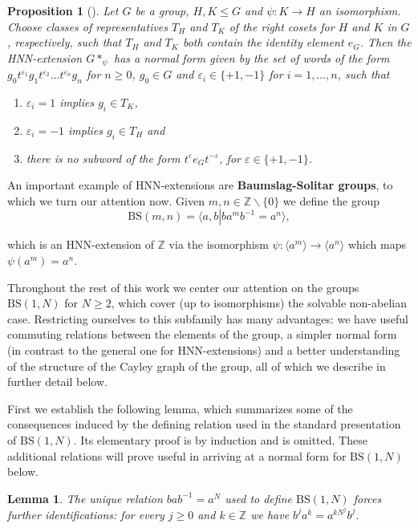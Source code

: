\documentclass[letterpaper,10pt]{amsart}
\theoremstyle{plain}
\newtheorem{lemma}[theorem]{Lemma}
\newtheorem{proposition}[theorem]{Proposition}
\newcommand{\BS}[1][N]{\mathrm{BS}(1,#1)}
\begin{document}
\begin{proposition}[{\cite[Theorem~IV.2.1]{lyndon_schupp_1977}}] \label{prop:hnn_general_normal_form}Let $G$ be a group, $H,K\le G$ and $\psi:K\to H$ an isomorphism. 
	Choose classes of representatives $T_H$ and $T_K$ of the right cosets for $H$ and $K$ in $G$, respectively, such that $T_H$ and $T_K$ both contain the identity element $e_G$. Then the HNN-extension $G*_\psi$ has a normal form given by the set of words of the form $g_0t^{\varepsilon_1}g_1t^{\varepsilon_2}\ldots t^{\varepsilon_n}g_n$ for $n\ge 0$, $g_0\in G$ and $\varepsilon_i\in \{+1,-1\}$ for $i=1,\ldots,n$, such that
	\begin{enumerate}
		\item $\varepsilon_i=1 $ implies $g_i\in T_K$,
		\item $\varepsilon_i=-1$ implies $g_i\in T_H$ and 
		\item there is no subword of the form $t^\varepsilon e_G t^{-\varepsilon}$, for $\varepsilon\in\{+1,-1\}$.
	\end{enumerate} 
\end{proposition}

An important example of HNN-extensions are \textbf{Baumslag-Solitar groups}, to which we turn our attention now. Given $m,n\in \mathbb{Z}\backslash\{0\}$ we define the group 
$$\mathrm{BS}(m,n)=\langle a,b \left|\right. ba^mb^{-1}=a^n\rangle,$$ 

which is an HNN-extension of $\mathbb{Z}$ via the isomorphism $\psi:\langle a^m \rangle\to \langle a^n\rangle$ which maps $\psi(a^m)=a^n$.

Throughout the rest of this work we center our attention on the groups $\mathrm{BS}(1,N)$ for $N\ge 2$, which cover (up to isomorphisms) the solvable non-abelian case. Restricting ourselves to this subfamily has many advantages: we have useful commuting relations between the elements of the group, a simpler normal form (in contrast to the general one for HNN-extensions) and a better understanding of the structure of the Cayley graph of the group, all of which we describe in further detail below.

First we establish the following lemma, which summarizes some of the consequences induced by the defining relation used in the standard presentation of $\BS$. Its elementary proof is by induction and is omitted. These additional relations will prove useful in arriving at a normal form for $\BS$ below.

\begin{lemma}\label{prop:bs_further_identifications} The unique relation $bab^{-1}=a^N$ used to define $\BS$ forces further identifications: for every $j\ge 0$ and $k\in \mathbb{Z}$ we have $b^{j}a^k=a^{kN^j}b^j$.
\end{lemma}
\end{document}
